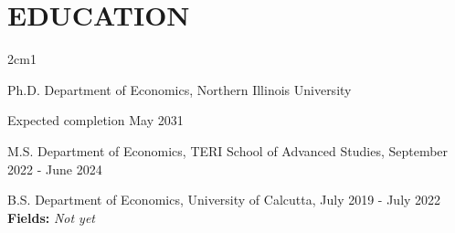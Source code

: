 \documentclass[final, 12pt]{article}
\begin{document}

\section*{EDUCATION}

\begin{hangparas}{2cm}{1}

 Ph.D. \tabto{2cm} Department of Economics, Northern Illinois University

\tabto{2cm} Expected completion May 2031

 
 M.S. \tabto{2cm} Department of Economics, TERI School of Advanced Studies, September 2022 - June 2024
  
B.S. \tabto{2cm} Department of Economics, University of Calcutta, July 2019 - July 2022\\

{\bf Fields:} \it Not yet\\

\end{hangparas}


\end{document}
